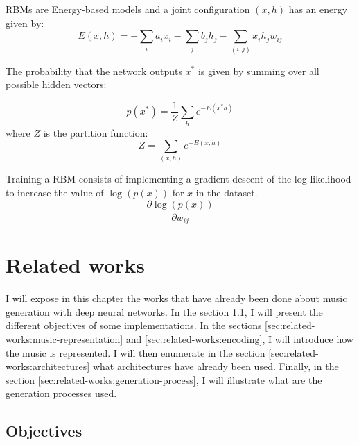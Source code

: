 \documentclass[12pt]{report}
\begin{document}
RBMs are Energy-based models and a joint configuration $(x, h)$ has an energy given by:
\begin{equation}
    E(x, h) = -\sum_i a_i x_i - \sum_j b_j h_j - \sum_{(i, j)} x_i h_j w_{ij}
\end{equation}

The probability that the network outputs $x^{*}$ is given by summing over all possible hidden vectors:

\begin{equation}
    p(x^{*}) = \frac{1}{Z} \sum_h e^{- E(x^{*} h)}
\end{equation}
where $Z$ is the partition function:
\begin{equation}
    Z = \sum_{(x,h)} e^{- E(x, h)}
\end{equation}

Training a RBM consists of implementing a gradient descent of the log-likelihood to increase the value of $\log(p(x))$ for $x$ in the dataset.
\begin{equation*}
    \frac{\partial \log(p(x))}{\partial w_{ij}}
\end{equation*}



\chapter{Related works}
\label{chap:related-works}

I will expose in this chapter the works that have already been done about music generation with deep neural networks.
In the section \ref{sec:related-works:objectives}, I will present the different objectives of some implementations.
In the sections \ref{sec:related-works:music-representation} and \ref{sec:related-works:encoding}, I will introduce how the music is represented.
I will then enumerate in the section \ref{sec:related-works:architectures} what architectures have already been used. 
Finally, in the section \ref{sec:related-works:generation-process}, I will illustrate what are the generation processes used.


\section{Objectives}        %
\label{sec:related-works:objectives}
\end{document}

